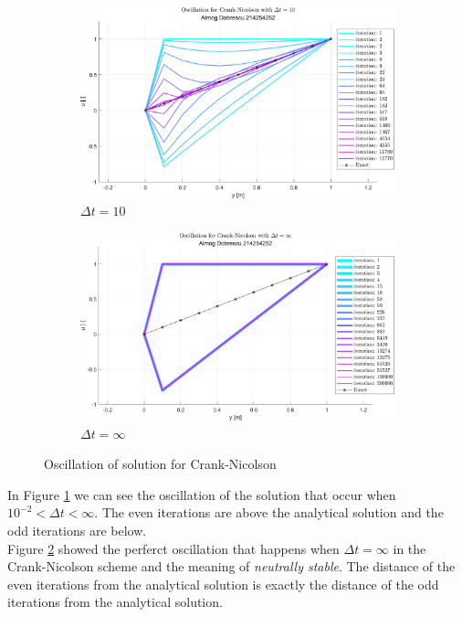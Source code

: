 \documentclass[11pt, a4paper]{article}
\begin{document}
\begin{figure}[H]
    \centering
    \begin{subfigure}[b]{.49\textwidth}
        \centering
        \includegraphics[width=\textwidth]{images/grap4.png}
        \caption{$\Delta t = 10$}
        \label{fig5A}
    \end{subfigure}
    \hfill
    \begin{subfigure}[b]{.49\textwidth}
        \centering
        \includegraphics[width=\textwidth]{images/grap6.png}
        \caption{$\Delta t = \infty$}
        \label{fig5B}
    \end{subfigure}
    \caption{Oscillation of solution for Crank-Nicolson}
    \label{fig5}
\end{figure}
\noindent In Figure \ref{fig5A} we can see the oscillation of the solution that occur when $ 10^{-2} < \Delta t < \infty$. The even iterations are above the analytical solution and the odd iterations are below.\\
Figure \ref{fig5B} showed the perferct oscillation that happens when $\Delta t=\infty$ in the Crank-Nicolson scheme and the meaning of \emph{neutrally stable}. The distance of the even iterations from the analytical solution is exactly the distance of the odd iterations from the analytical solution.
\end{document}
